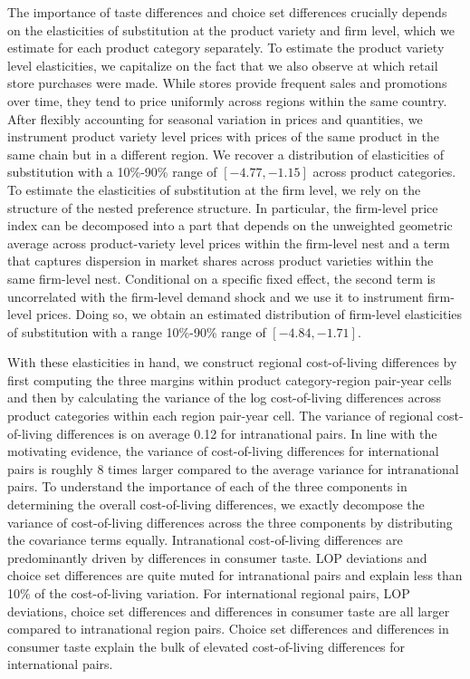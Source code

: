 The importance of taste differences and choice set differences crucially depends on the elasticities of substitution at the product variety and firm level, which we estimate for each product category separately. To estimate the product variety level elasticities, we capitalize on the fact that we also observe at which retail store purchases were made. While stores provide frequent sales and promotions over time, they tend to price uniformly across regions within the same country. After flexibly accounting for seasonal variation in prices and quantities, we instrument product variety level prices with prices of the same product in the same chain but in a different region. We recover a distribution of elasticities of substitution with a 10\%-90\% range of $[-4.77,-1.15]$ across product categories. To estimate the elasticities of substitution at the firm level, we rely on the structure of the nested preference structure. In particular, the firm-level price index can be decomposed into a part that depends on the unweighted geometric average across product-variety level prices within the firm-level nest and a term that captures dispersion in market shares across product varieties within the same firm-level nest. Conditional on a specific fixed effect, the second term is uncorrelated with the firm-level demand shock and we use it to instrument firm-level prices. Doing so, we obtain an estimated distribution of firm-level elasticities of substitution with a range 10\%-90\% range of $[-4.84,-1.71]$.  

With these elasticities in hand, we construct regional cost-of-living differences by first computing the three margins within product category-region pair-year cells and then by calculating the variance of the log cost-of-living differences across product categories within each region pair-year cell. The variance of regional cost-of-living differences is on average 0.12 for intranational pairs. In line with the motivating evidence, the variance of cost-of-living differences for international pairs is roughly 8 times larger compared to the average variance for intranational pairs. To understand the importance of each of the three components in determining the overall cost-of-living differences, we exactly decompose the variance of cost-of-living differences across the three components by distributing the covariance terms equally. Intranational cost-of-living differences are predominantly driven by differences in consumer taste. LOP deviations and choice set differences are quite muted for intranational pairs and explain less than 10\% of the cost-of-living variation. For international regional pairs, LOP deviations, choice set differences and differences in consumer taste are all larger compared to intranational region pairs. Choice set differences and differences in consumer taste explain the bulk of elevated cost-of-living differences for international pairs.

